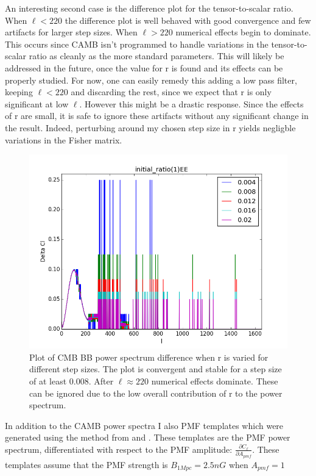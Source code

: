  
An interesting second case is the difference plot for the tensor-to-scalar ratio. When $\ell < 220$ the difference plot is well behaved with good convergence and few artifacts for larger step sizes. When $\ell > 220$ numerical effects begin to dominate. This occurs since CAMB isn't programmed to handle variations in the tensor-to-scalar ratio as cleanly as the more standard parameters. This will likely be addressed in the future, once the value for r is found and its effects can be properly studied. For now, one can easily remedy this adding a low pass filter, keeping $\ell < 220$ and discarding the rest, since we expect that r is only significant at low $\ell$. However this might be a drastic response. Since the effects of r are small, it is safe to ignore these artifacts without any significant change in the result. Indeed, perturbing around my chosen step size in r yields negligble variations in the Fisher matrix.

\begin{figure}[h]
\centering
\includegraphics[scale=0.75]{images/diffs/reez.png}
\caption{Plot of CMB BB power spectrum difference when r is varied for different step sizes. The plot is convergent and stable for a step size of at least 0.008. After $\ell \approx 220$ numerical effects dominate. These can be ignored due to the low overall contribution of r to the power spectrum.}
\end{figure}
 
 
In addition to the CAMB power spectra I also PMF templates which were generated using the method from \cite{Ade:2015cao} and \cite{PhysRevD.80.023510}. These templates are the PMF power spectrum, differentiated with respect to the PMF amplitude: $\frac{\partial C_{\ell}}{\partial A_{pmf}}$.
These templates assume that the PMF strength is $B_{1Mpc} = 2.5nG$ when $A_{pmf} = 1$

